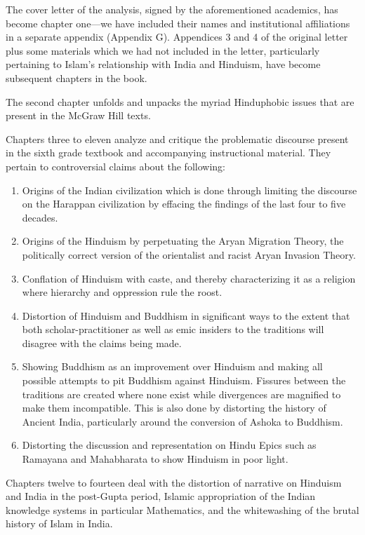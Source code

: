 The cover letter of the analysis, signed by the aforementioned academics, has become chapter one—we have included their names and institutional affiliations in a separate appendix (Appendix G). Appendices 3 and 4 of the original letter plus some materials which we had not included in the letter, particularly pertaining to Islam’s relationship with India and Hinduism, have become subsequent chapters in the book. 

The second chapter unfolds and unpacks the myriad Hinduphobic issues that are present in the McGraw Hill texts.

Chapters three to eleven analyze and critique the problematic discourse present in the sixth grade textbook and accompanying instructional material. They pertain to controversial claims about the following:
\begin{enumerate}
\item Origins of the Indian civilization which is done through limiting the discourse on the Harappan civilization by effacing the findings of the last four to five decades.
\item Origins of the Hinduism by perpetuating the Aryan Migration Theory, the politically correct version of the orientalist and racist Aryan Invasion Theory. 
\item Conflation of Hinduism with caste, and thereby characterizing it as a religion where hierarchy and oppression rule the roost. 
\item Distortion of Hinduism and Buddhism in significant ways to the extent that both scholar-practitioner as well as emic insiders to the traditions will disagree with the claims being made. 
\item Showing Buddhism as an improvement over Hinduism and making all possible attempts to pit Buddhism against Hinduism. Fissures between the traditions are created where none exist while divergences are magnified to make them incompatible. This is also done by distorting the history of Ancient India, particularly around the conversion of Ashoka to Buddhism. 
\item Distorting the discussion and representation on Hindu Epics such as Ramayana and Mahabharata to show Hinduism in poor light. 
\end{enumerate}
Chapters twelve to fourteen deal with the distortion of narrative on Hinduism and India in the post-Gupta period, Islamic appropriation of the Indian knowledge systems in particular Mathematics, and the whitewashing of the brutal history of Islam in India. 
